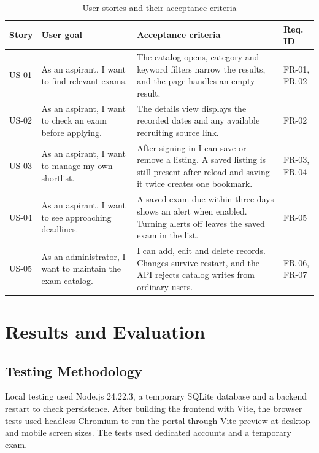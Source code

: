 \documentclass[12pt,a4paper]{report}
\begin{document}
\begin{table}[H]
\centering\small
\begin{tabular}{>{\raggedright\arraybackslash}p{}>{\raggedright\arraybackslash}p{}>{\raggedright\arraybackslash}p{}>{\raggedright\arraybackslash}p{}}
\toprule
\textbf{Story} & \textbf{User goal} & \textbf{Acceptance criteria} & \textbf{Req. ID} \\ \midrule
US-01 & As an aspirant, I want to find relevant exams. & The catalog opens, category and keyword filters narrow the results, and the page handles an empty result. & FR-01, FR-02 \\
US-02 & As an aspirant, I want to check an exam before applying. & The details view displays the recorded dates and any available recruiting source link. & FR-02 \\
US-03 & As an aspirant, I want to manage my own shortlist. & After signing in I can save or remove a listing. A saved listing is still present after reload and saving it twice creates one bookmark. & FR-03, FR-04 \\
US-04 & As an aspirant, I want to see approaching deadlines. & A saved exam due within three days shows an alert when enabled. Turning alerts off leaves the saved exam in the list. & FR-05 \\
US-05 & As an administrator, I want to maintain the exam catalog. & I can add, edit and delete records. Changes survive restart, and the API rejects catalog writes from ordinary users. & FR-06, FR-07 \\
\bottomrule
\end{tabular}
\setcounter{table}{6}
\caption{User stories and their acceptance criteria}
\end{table}

\chapter{Results and Evaluation}

\section{Testing Methodology}

Local testing used Node.js 24.22.3, a temporary SQLite database and a backend restart to check persistence. After building the frontend with Vite, the browser tests used headless Chromium to run the portal through Vite preview at desktop and mobile screen sizes. The tests used dedicated accounts and a temporary exam.
\end{document}
